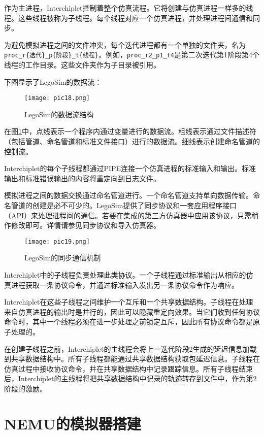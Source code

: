\documentclass[bachelor]{thesis-uestc}
\begin{document}
作为主进程，Interchiplet控制着整个仿真流程。它将创建与仿真进程一样多的线程。这些线程被称为子线程。每个线程对应一个仿真进程，并处理进程间通信和同步。

为避免模拟进程之间的文件冲突，每个迭代进程都有一个单独的文件夹，名为\texttt{proc\_r\{迭代\}\_p\{阶段\}\_t\{线程\}}。例如，\texttt{proc\_r2\_p1\_t4}是第二次迭代第1阶段第4个线程的工作目录。这些文件夹作为子目录被引用。

下图显示了LegoSim的数据流：
\begin{figure}[h]
    \texttt{[image: pic18.png]}
    \caption{LegoSim的数据流结构}
    \label{pic18}
\end{figure}

在图\ref{pic18}中，点线表示一个程序内通过变量进行的数据流。粗线表示通过文件描述符（包括管道、命名管道和标准文件接口）进行的数据流。细线表示创建命名管道的控制流。

Interchiplet的每个子线程都通过PIPE连接一个仿真进程的标准输入和输出。标准输出和标准错误输出的内容将重定向到日志文件。

模拟进程之间的数据交换通过命名管道进行。一个命名管道支持单向数据传输。命名管道的创建是必不可少的。LegoSim提供了同步协议和一套应用程序接口（API）来处理进程间的通信。若要在集成的第三方仿真器中应用该协议，只需稍作修改即可。详情请参见同步协议和导入仿真器。

\begin{figure}[h]
    \texttt{[image: pic19.png]}
    \caption{LegoSim的同步通信机制}
    \label{pic19}
\end{figure}

Interchiplet中的子线程负责处理此类协议。一个子线程通过标准输出从相应的仿真进程获取一条协议命令，并通过标准输入发出另一条协议命令作为响应。

Interchiplet在这些子线程之间维护一个互斥和一个共享数据结构。子线程在处理来自仿真进程的输出时是并行的，因此可以隐藏重定向效果。当它们收到任何协议命令时，其中一个线程必须在进一步处理之前锁定互斥，因此所有协议命令都是原子处理的。

在创建子线程之前，Interchiplet的主线程会将上一迭代阶段2生成的延迟信息加载到共享数据结构中。所有子线程都能通过共享数据结构获取包延迟信息。子线程在仿真过程中接收协议命令，并在共享数据结构中记录跟踪信息。所有子线程结束后，Interchiplet的主线程将把共享数据结构中记录的轨迹转存到文件中，作为第2阶段的激励。


\section{NEMU的模拟器搭建}
\end{document}
